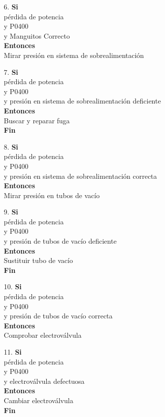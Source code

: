 \documentclass[a4paper,12pt]{article}
\newcommand\tab[1][1cm]{\hspace*{#1}}
\begin{document}
\begin{itemize}
\item[6.]\textbf{Si}\\ \tab pérdida de potencia\\ \tab y P0400\\ \tab y Manguitos Correcto\\ \textbf{Entonces}\\ \tab Mirar presión en sistema de sobrealimentación
\item[7.]\textbf{Si}\\ \tab pérdida de potencia\\ \tab y P0400\\ \tab y presión en sistema de sobrealimentación deficiente\\ \textbf{Entonces}\\ \tab Buscar y reparar fuga\\ \tab \textbf{Fin}
\item[8.]\textbf{Si}\\ \tab pérdida de potencia\\ \tab y P0400\\ \tab y presión en sistema de sobrealimentación correcta\\ \textbf{Entonces}\\ \tab Mirar presión en tubos de vacío
\item[9.]\textbf{Si}\\ \tab pérdida de potencia\\ \tab y P0400\\ \tab y presión de tubos de vacío deficiente\\ \textbf{Entonces}\\ \tab Sustituir tubo de vacío\\ \tab \textbf{Fin}
\item[10.]\textbf{Si}\\ \tab pérdida de potencia\\ \tab y P0400\\ \tab y presión de tubos de vacío correcta\\ \textbf{Entonces}\\ \tab Comprobar electroválvula
\item[11.]\textbf{Si}\\ \tab pérdida de potencia\\ \tab y P0400\\ \tab y electroválvula defectuosa\\\textbf{Entonces}\\ \tab Cambiar electroválvula\\ \tab \textbf{Fin}

\end{itemize}
\end{document}
